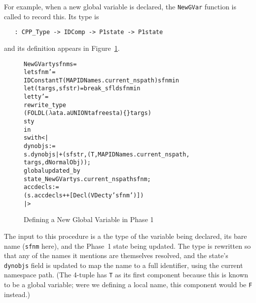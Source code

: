 \documentclass[11pt]{article}
\newcommand{\lbr}{\texttt{\{}}
\newcommand{\rbr}{\texttt{\}}}
\begin{document}
For example, when a new global variable is declared, the
\texttt{NewGVar} function is called to record this.  Its type is
\begin{verbatim}
   : CPP_Type -> IDComp -> P1state -> P1state
\end{verbatim}
and its definition appears in Figure~\ref{fig:newgvar-def}.
\begin{figure}[hbtp]
\begin{center}
\begin{minipage}{\textwidth}
\begin{alltt}
   NewGVar ty sfnm s =
     let sfnm' =
       IDConstant T (MAP IDName s.current_nspath) sfnm in
     let (targs,sfstr) = break_sfld sfnm in
     let ty' =
       rewrite_type
         (FOLDL (\(\lambda\)a ta. a UNION tafrees ta) \lbr\rbr targs)
         s ty
     in
       s with <|
         dynobjs :=
           s.dynobjs |+ (sfstr, (T,MAP IDName s.current_nspath,
                                 targs, dNormalObj)) ;
         global updated_by
           state_NewGVar ty s.current_nspath sfnm ;
         accdecls :=
           (s.accdecls ++ [Decl (VDec ty' sfnm')])
       |>
\end{alltt}
\end{minipage}
\end{center}
\caption{Defining a New Global Variable in Phase 1}
\label{fig:newgvar-def}
\end{figure}
The input to this procedure is a the type of the variable being
declared, its bare name (\texttt{sfnm} here), and the Phase~1 state
being updated.  The type is rewritten so that any of the names it
mentions are themselves resolved, and the state's \texttt{dynobjs}
field is updated to map the name to a full identifier, using the
current namespace path.  (The 4-tuple has \texttt{T} as its first
component because this is known to be a global variable; were we
defining a local name, this component would be \texttt{F} instead.)
\end{document}
